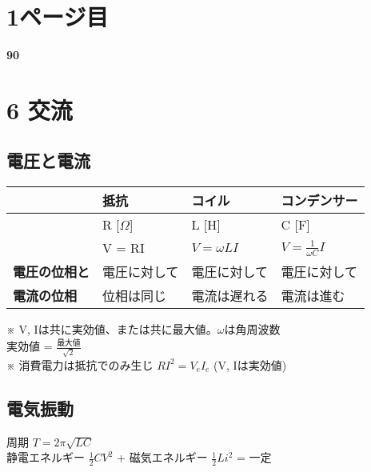 \documentclass[a4paper, 10pt, dvipdfmx]{bxjsarticle}
\begin{document}


\section*{1ページ目}

\noindent
\textbf{90}

\section*{6 交流}

\subsection*{電圧と電流}
\begin{tabular}{|l|l|l|l|}
\hline
 & \textbf{抵抗} & \textbf{コイル} & \textbf{コンデンサー} \\ \hline
 & R [$\Omega$] & L [H] & C [F] \\ \hline
 & V = RI & $V = \omega LI$ & $V = \frac{1}{\omega C}I$ \\ \hline
\textbf{電圧の位相と} & 電圧に対して & 電圧に対して & 電圧に対して \\
\textbf{電流の位相} & 位相は同じ & 電流は遅れる & 電流は進む \\ \hline
\end{tabular}

\begin{flushleft}
※ V, Iは共に実効値、または共に最大値。$\omega$は角周波数 \\
実効値 = $\frac{\text{最大値}}{\sqrt{2}}$ \\
※ 消費電力は抵抗でのみ生じ $RI^2 = V_eI_e$ (V, Iは実効値)
\end{flushleft}

\subsection*{電気振動}
\begin{flushleft}
周期 $T = 2\pi\sqrt{LC}$ \\
静電エネルギー $\frac{1}{2}CV^2$ + 磁気エネルギー $\frac{1}{2}Li^2$ = 一定
\end{flushleft}

\bigskip
\end{document}
